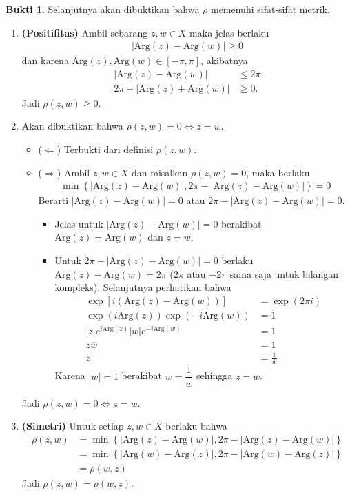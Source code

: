 \documentclass[a4paper]{article}
\theoremstyle{definition}
\newtheorem*{bukti}{Bukti}
\newcommand{\Arg}{\text{Arg}}
\begin{document}
\begin{bukti}
    Selanjutnya akan dibuktikan bahwa \(\rho\) memenuhi sifat-sifat metrik.
    \begin{enumerate}
      \item \textbf{(Positifitas)} Ambil sebarang \( z, w \in X \) maka jelas berlaku 
      \begin{align*}
        |\Arg(z) - \Arg(w)| \geq 0
      \end{align*}
      dan karena $\Arg(z),\Arg(w) \in [-\pi,\pi]$, akibatnya 
      \begin{align*}
        |\Arg(z) - \Arg(w)| &\leq 2\pi\\
        2\pi - |\Arg(z) + \Arg(w)| &\geq 0.
      \end{align*}
      Jadi \(\rho(z,w) \geq 0\). 
      \item Akan dibuktikan bahwa \(\rho(z,w) = 0 \iff z = w\). 
      \begin{itemize}
        \item (\(\Leftarrow\)) Terbukti dari definisi \(\rho(z,w)\).
        \item (\(\Rightarrow\)) Ambil $z,w\in X$ dan misalkan \( \rho(z,w) = 0 \), maka berlaku
        \begin{align*}
          \min\left\{ \left|\Arg(z)-\Arg(w)\right|, 2\pi - \left|\Arg(z) - \Arg(w)\right| \right\} = 0
        \end{align*}
        Berarti \(|\Arg(z) - \Arg(w)|=0\) atau \(2\pi - |\Arg(z) - \Arg(w)| = 0\). 
        \begin{itemize}
          \item Jelas untuk \(|\Arg(z) - \Arg(w)|=0\) berakibat \(\Arg(z) = \Arg(w)\) dan \(z = w\).
          \item Untuk \(2\pi - |\Arg(z) - \Arg(w)| = 0\) berlaku \(\Arg(z) - \Arg(w) = 2\pi\) ($2\pi$ atau $-2\pi$ sama saja untuk bilangan kompleks). Selanjutnya perhatikan bahwa
          \begin{align*}
            \exp\left[i(\Arg(z)-\Arg(w))\right] &= \exp(2\pi i)\\
            \exp(i\Arg(z))\exp(-i\Arg(w)) &= 1\\
            |z|e^{i\Arg(z)}|w|e^{-i\Arg(w)} &= 1\\
            z\overline{w} &= 1\\
            z&= \frac{1}{\overline{w}}
          \end{align*}
          Karena $|w|=1$ berakibat $w=\dfrac{1}{\overline{w}}$ sehingga $z=w$.
        \end{itemize}
      \end{itemize}
      Jadi \(\rho(z,w) = 0 \iff z = w\). 
      \item \textbf{(Simetri)} Untuk setiap \( z, w \in X \) berlaku bahwa 
      \begin{align*}
        \rho(z,w)&=\min\left\{ \left|\Arg(z)-\Arg(w)\right|, 2\pi - \left|\Arg(z) - \Arg(w)\right| \right\} \\
        &= \min\left\{ \left|\Arg(w)-\Arg(z)\right|, 2\pi - \left|\Arg(w) - \Arg(z)\right| \right\}\\
        &=\rho(w,z)
      \end{align*}
      Jadi \(\rho(z,w) = \rho(w,z)\).
      

\end{enumerate}
\end{bukti}
\end{document}
